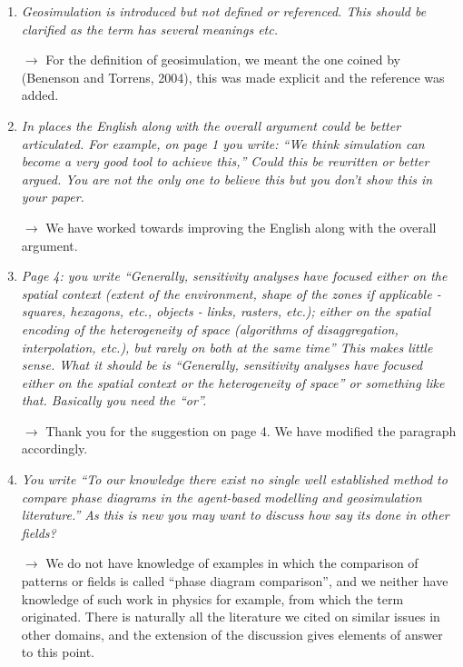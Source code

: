 \documentclass[11pt,a4paper,sans]{moderncv}        %
\begin{document}
\begin{enumerate}
	\item \textit{Geosimulation is introduced but not defined or referenced.  This should be clarified as the term has several meanings etc.}
	
	\medskip
	
	$\rightarrow$ For the definition of geosimulation, we meant the one coined by (Benenson and Torrens, 2004), this was made explicit and the reference was added. 
    \bigskip
    	
	\item \textit{In places the English along with the overall argument could be better articulated. For example, on page 1 you write: “We think simulation can become a very good tool to achieve this,”  Could this be rewritten or better argued. You are not the only one to believe this but you don’t show this in your paper.}
	
	\medskip
	
	$\rightarrow$ We have worked towards improving the English along with the overall argument. 
	\bigskip
	
	\item \textit{Page 4: you write “Generally, sensitivity analyses have focused either on the spatial context (extent of the environment, shape of the zones if applicable - squares, hexagons, etc., objects - links, rasters, etc.); either on the spatial encoding of the heterogeneity of space (algorithms of disaggregation, interpolation, etc.), but rarely on both at the same time” This makes little sense. What it should be is “Generally, sensitivity analyses have focused either on the spatial context or the heterogeneity of space” or something like that. Basically you need the “or”.}
	
	\medskip
	
	$\rightarrow$ Thank you for the suggestion on page 4. We have modified the paragraph accordingly.
	\bigskip


	\item \textit{You write “To our knowledge there exist no single well established method to compare phase diagrams in the agent-based modelling and geosimulation literature.” As this is new you may want to discuss how say its done in other fields? }
	
	\medskip
	
	$\rightarrow$ We do not have knowledge of examples in which the comparison of patterns or fields is called ``phase diagram comparison'', and we neither have knowledge of such work in physics for example, from which the term originated. There is naturally all the literature we cited on similar issues in other domains, and the extension of the discussion gives elements of answer to this point.
	\bigskip
	

\end{enumerate}
\end{document}
